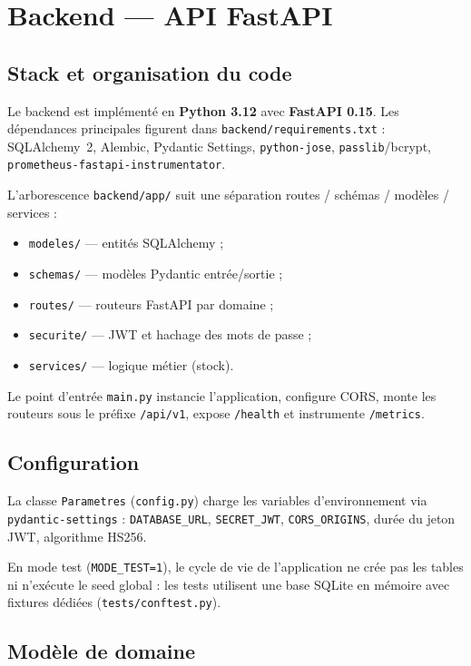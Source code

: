 \chapter{Backend — API FastAPI}
\label{ch:backend}

\section{Stack et organisation du code}

Le backend est implémenté en \textbf{Python 3.12} avec \textbf{FastAPI 0.15}. Les dépendances principales figurent dans \texttt{backend/requirements.txt} : SQLAlchemy~2, Alembic, Pydantic Settings, \texttt{python-jose}, \texttt{passlib}/bcrypt, \texttt{prometheus-fastapi-instrumentator}.

L'arborescence \texttt{backend/app/} suit une séparation routes / schémas / modèles / services :

\begin{itemize}
  \item \texttt{modeles/} — entités SQLAlchemy ;
  \item \texttt{schemas/} — modèles Pydantic entrée/sortie ;
  \item \texttt{routes/} — routeurs FastAPI par domaine ;
  \item \texttt{securite/} — JWT et hachage des mots de passe ;
  \item \texttt{services/} — logique métier (stock).
\end{itemize}

Le point d'entrée \texttt{main.py} instancie l'application, configure CORS, monte les routeurs sous le préfixe \texttt{/api/v1}, expose \texttt{/health} et instrumente \texttt{/metrics}.

\section{Configuration}

La classe \texttt{Parametres} (\texttt{config.py}) charge les variables d'environnement via \texttt{pydantic-settings} : \texttt{DATABASE\_URL}, \texttt{SECRET\_JWT}, \texttt{CORS\_ORIGINS}, durée du jeton JWT, algorithme HS256.

En mode test (\texttt{MODE\_TEST=1}), le cycle de vie de l'application ne crée pas les tables ni n'exécute le seed global : les tests utilisent une base SQLite en mémoire avec fixtures dédiées (\texttt{tests/conftest.py}).

\section{Modèle de domaine}

